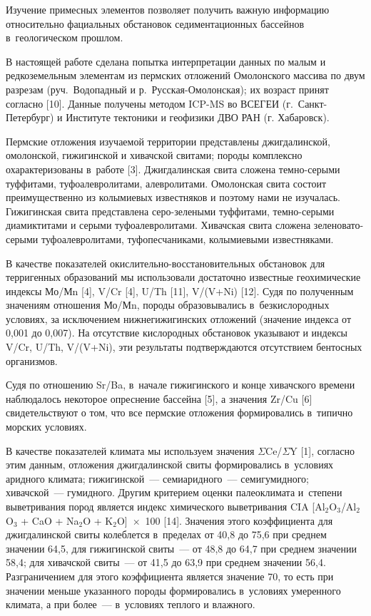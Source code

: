  

\makeProcTitleRazdel
{}

Изучение примесных элементов позволяет получить важную информацию относительно фациальных обстановок седиментационных бассейнов в~геологическом прошлом.

В настоящей работе сделана попытка интерпретации данных по малым и редкоземельным элементам из пермских отложений Омолонского массива по двум разрезам (руч.~Водопадный и р.~Русская-Омолонская); их возраст принят согласно [10]. Данные получены методом ICP-MS во ВСЕГЕИ (г.~Санкт-Петербург) и Институте тектоники и геофизики ДВО РАН (г. Хабаровск).

Пермские отложения изучаемой территории представлены джигдалинской, омолонской, гижигинской и хивачской свитами; породы комплексно охарактеризованы в~работе [3]. Джигдалинская свита сложена темно-серыми туффитами, туфоалевролитами, алевролитами. Омолонская свита состоит преимущественно из колымиевых известняков и поэтому нами не изучалась. Гижигинская свита представлена серо-зелеными туффитами, темно-серыми диамиктитами и серыми туфоалевролитами. Хивачская свита сложена зеленовато-серыми туфоалевролитами, туфопесчаниками, колымиевыми известняками.

В качестве показателей окислительно-восстановительных обстановок для терригенных образований мы использовали достаточно известные геохимические индексы Мо/Мn [4], V/Cr [4], U/Th [11], V/(V+Ni) [12]. Судя по полученным значениям отношения Мо/Мn, породы образовывались в~безкислородных условиях, за исключением нижнегижигинских отложений (значение индекса от 0,001 до 0,007). На отсутствие кислородных обстановок указывают и индексы V/Cr, U/Th, V/(V+Ni), эти результаты подтверждаются отсутствием
бентосных организмов.

Судя по отношению Sr/Ba, в~начале гижигинского и конце хивачского времени наблюдалось некоторое опреснение бассейна [5], а значения Zr/Cu [6] свидетельствуют о том, что все пермские отложения формировались в~типично морских условиях.

В качестве показателей климата мы используем значения $\Sigma$Ce/$\Sigma$Y [1], согласно этим данным, отложения джигдалинской свиты формировались в~условиях аридного климата; гижигинской~--- семиаридного~--- семигумидного; хивачской~--- гумидного. Другим критерием оценки палеоклимата и~степени выветривания пород является индекс химического выветривания CIA [Al$_{2}$O$_{3}$/Al$_{2}$O$_{3}$ + CaO + Na$_{2}$O + K$_{2}$O]~$\times$~100 [14]. Значения этого коэффициента для джигдалинской свиты колеблется в~пределах от 40,8 до 75,6 при среднем значении 64,5, для гижигинской свиты~--- от 48,8 до 64,7 при среднем значении 58,4; для хивачской свиты~--- от 41,5 до 63,9 при среднем значении 56,4. \enlargethispage{\baselineskip}Разграничением для этого коэффициента является значение 70, то есть при значении меньше указанного породы формировались в~условиях умеренного климата, а при более~--- в~условиях теплого и влажного.


